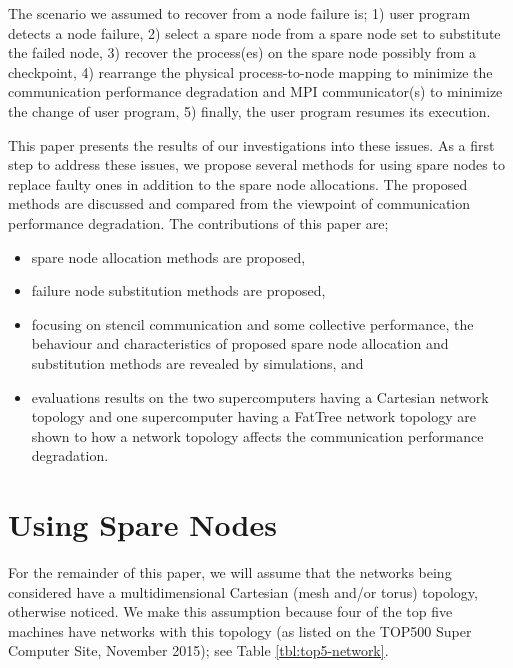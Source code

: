 \documentclass[Afour,times,sagev]{sagej}
\begin{document}
The scenario we assumed to recover from a node failure is;
1) user program detects a node failure, 2) select a spare node from a
spare node set to substitute the failed node, 3) recover the
process(es) on the spare node possibly from a checkpoint, 4)
rearrange the physical process-to-node mapping to minimize the
communication performance degradation and MPI communicator(s) to
minimize the change of user program, 5) finally, the user program
resumes its execution. 

This paper presents the results of our investigations into these
issues. As a first step to address these issues, we propose several
methods for using spare nodes to replace faulty ones in addition to
the spare node allocations. The proposed methods are discussed and
compared from the viewpoint of communication performance
degradation. The contributions of this paper are;  

\begin{itemize}
\item spare node allocation methods are proposed,
\item failure node substitution methods are proposed,
\item focusing on stencil communication and some collective
  performance, the behaviour and characteristics of proposed spare
  node allocation and substitution methods are revealed by simulations, and
\item evaluations results on the two supercomputers having a Cartesian
  network topology and one supercomputer having a FatTree network
  topology are shown to how a network topology affects the communication
  performance degradation.
\end{itemize}

\section{Using Spare Nodes}

For the remainder of this paper, we will assume that the networks
being considered have a multidimensional Cartesian (mesh and/or torus)
topology, otherwise noticed. We make this assumption because four of
the top five machines have networks with this topology (as listed on
the TOP500 Super Computer Site\citep{top500}, November
2015); see Table \ref{tbl:top5-network}. 
\end{document}
